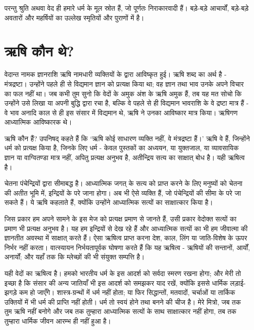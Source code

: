 परन्तु श्रुति अथवा वेद ही हमारे धर्म के मूल स्रोत हैं, जो पूर्णतः निराकारवादी हैं। बड़े-बड़े आचार्यों, बड़े-बड़े अवतारों और महर्षियों का उल्लेख स्मृतियों और पुराणों में है।


\section*{ऋषि कौन थे?}


वेदान्त नामक ज्ञानराशि ऋषि नामधारी व्यक्तियों के द्वारा आविष्कृत हुई। ऋषि शब्द का अर्थ है - मंत्रद्रष्टा। उन्होंने पहले ही से विद्यमान ज्ञान को प्रत्यक्ष किया था; वह ज्ञान तथा भाव उनके अपने विचार का फल नहीं था। जब कभी तुम सुनो कि वेदों के अमुक अंश के ऋषि अमुक हैं, तब यह मत सोचो कि उन्होंने उसे लिखा या अपनी बुद्धि द्वारा रचा है, बल्कि वे पहले से ही विद्यमान भावराशि के वे द्रष्टा मात्र हैं - वे भाव अनादि काल से ही इस संसार में विद्यमान थे, ऋषि ने उनका आविष्कार मात्र किया। ऋषिगण आध्यात्मिक आविष्कारक थे। 

ऋषि कौन हैं? उपनिषद् कहते हैं कि ‘ऋषि कोई साधारण व्यक्ति नहीं, वे मंत्रद्रष्टा हैं।’ ऋषि वे हैं, जिन्होंने धर्म को प्रत्यक्ष किया है, जिनके लिए धर्म - केवल पुस्तकों का अध्ययन, या युक्तजाल, या व्यावसायिक ज्ञान या वाग्वितण्डा मात्र नहीं, अपितु प्रत्यक्ष अनुभव है, अतीन्द्रिय सत्य का साक्षात् बोध है। यही ऋषित्व है। 

चेतना पंचेन्द्रियों द्वारा सीमाबद्ध है। आध्यात्मिक जगत् के सत्य को प्राप्त करने के लिए मनुष्यों को चेतना की अतीत भूमि में, इन्द्रियों के परे जाना होगा। अब भी ऐसे व्यक्ति हैं, जो पंचेन्द्रियों की सीमा के परे जा सकते हैं। ये ऋषि कहलाते हैं, क्योंकि उन्होंने आध्यात्मिक सत्यों का साक्षात्कार किया है। 

जिस प्रकार हम अपने सामने के इस मेज को प्रत्यक्ष प्रमाण से जानते हैं, उसी प्रकार वेदोक्त सत्यों का प्रमाण भी प्रत्यक्ष अनुभव है। यह हम इन्द्रियों से देख रहे हैं और आध्यात्मिक सत्यों का भी हम जीवात्मा की ज्ञानतीत अवस्था में साक्षात् करते हैं। ऐसा ऋषित्व प्राप्त करना देश, काल, लिंग या जाति-विशेष के ऊपर निर्भर नहीं करता। वात्स्यायन निर्भयतापूर्वक घोषणा करते हैं कि यह ऋषित्व - ऋषियों की सन्तानों, आर्यों, अनार्यों; और यहाँ तक कि म्लेच्छों की भी संयुक्त सम्पत्ति है। 

यही वेदों का ऋषित्व है। हमको भारतीय धर्म के इस आदर्श को सर्वदा स्मरण रखना होगा; और मेरी तो इच्छा है कि संसार की अन्य जातियाँ भी इस आदर्श को समझकर याद रखें, क्योंकि इससे धार्मिक लड़ाई-झगड़े कम हो जाएँगे। शास्त्र-ग्रन्थों में धर्म नहीं होता; या फिर सिद्धान्तों, मतवादों, चर्चाओं या तार्किक उक्तियों में भी धर्म की प्राप्ति नहीं होती। धर्म तो स्वयं होने तथा बनने की चीज है। मेरे मित्रो, जब तक तुम ऋषि नहीं बनोगे और जब तक तुम्हारा आध्यात्मिक सत्यों के साथ साक्षात्कार नहीं होगा, तब तक तुम्हारा धार्मिक जीवन आरम्भ ही नहीं हुआ है। 

